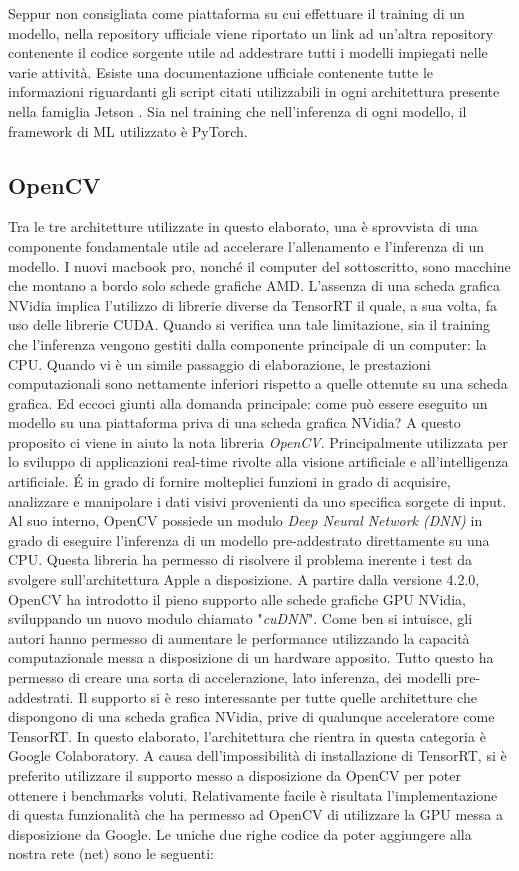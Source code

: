Seppur non consigliata come piattaforma su cui effettuare il 
training di un modello, nella repository ufficiale \cite{repo_jetson_nano} viene riportato un link ad 
un'altra repository \cite{repo_pytorch_training} contenente il codice sorgente utile ad addestrare tutti 
i modelli impiegati nelle varie attività. Esiste una documentazione ufficiale 
contenente tutte le informazioni riguardanti gli script citati utilizzabili in 
ogni architettura presente nella famiglia Jetson \cite{Documentation_jetson}. Sia nel training che 
nell'inferenza di ogni modello, il framework di ML utilizzato è PyTorch.

\subsection{OpenCV}
Tra le tre architetture utilizzate in questo elaborato, una è sprovvista di una componente fondamentale utile ad accelerare l'allenamento e l'inferenza di un modello. I nuovi macbook pro, nonché il computer del sottoscritto, sono macchine che montano a bordo solo schede grafiche AMD. L'assenza di una scheda grafica NVidia implica l'utilizzo di librerie diverse da TensorRT il quale, a sua volta, fa uso delle librerie CUDA. Quando si verifica una tale limitazione, sia il training che l'inferenza vengono gestiti dalla componente principale di un computer: la CPU. Quando vi è un simile passaggio di elaborazione, le prestazioni computazionali sono nettamente inferiori rispetto a quelle ottenute su una scheda grafica. Ed eccoci giunti alla domanda principale: come può essere eseguito un modello su una piattaforma priva di una scheda grafica NVidia? A questo proposito ci viene in aiuto la nota libreria \emph{OpenCV}.
Principalmente utilizzata per lo sviluppo di applicazioni real-time rivolte alla visione artificiale e all'intelligenza artificiale. É in grado di fornire molteplici funzioni in grado di acquisire, analizzare e manipolare i dati visivi provenienti da uno specifica sorgete di input. Al suo interno, OpenCV possiede un modulo \emph{Deep Neural Network (DNN)} in grado di eseguire l'inferenza di un modello pre-addestrato direttamente su una CPU.
Questa libreria ha permesso di risolvere il problema inerente i test da svolgere sull'architettura Apple a disposizione. A partire dalla versione 4.2.0, OpenCV ha introdotto il pieno supporto alle schede grafiche GPU NVidia, sviluppando un nuovo modulo chiamato "\emph{cuDNN}".
Come ben si intuisce, gli autori hanno permesso di aumentare le performance utilizzando la capacità computazionale messa a disposizione di un hardware apposito. Tutto questo ha permesso di creare una sorta di accelerazione, lato inferenza, dei modelli pre-addestrati. Il supporto si è reso interessante per tutte quelle architetture che dispongono di una scheda grafica NVidia, prive di qualunque acceleratore come TensorRT. In questo elaborato, l'architettura che rientra in questa categoria è Google Colaboratory. A causa dell'impossibilità di installazione di TensorRT, si è preferito utilizzare il supporto messo a disposizione da OpenCV per poter ottenere i benchmarks voluti. Relativamente facile è risultata l'implementazione di questa funzionalità che ha permesso ad OpenCV di utilizzare la GPU messa a disposizione da Google. Le uniche due righe codice da poter aggiungere alla nostra rete (net) sono le seguenti:
